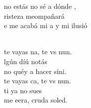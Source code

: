 \documentclass[12pt]{article}
\begin{document}
\begin{multicols*}{2}
\begin{cancion}
	no estás no sé a dónde ,\\
	risteza meompañará\\
	e me acabá mi a y mi ilusió\\\jump\\
	\begin{chorus}%
	 te vayas na, te vs nun.\\
	lgún díú notás\\
	no  quéy a hacer sini. \\
	 te vayas ca, te vs nun.\\
	ti ya no  sues\\
	me eera, cruda soled.\\
	\end{chorus}%
	\jump\\
\end{cancion}%


\end{multicols*}
\end{document}
